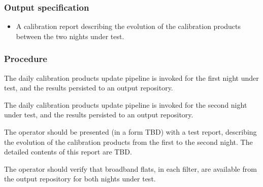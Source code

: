 \subsubsection{Output specification}

\begin{itemize}

  \item{A calibration report describing the evolution of the calibration
  products between the two nights under test.}

\end{itemize}

\subsubsection{Procedure}

The daily calibration products update pipeline is invoked for the first night
under test, and the results persisted to an output repository.

The daily calibration products update pipeline is invoked for the second night
under test, and the results persisted to an output repository.

The operator should be presented (in a form TBD) with a test report,
describing the evolution of the calibration products from the first to the
second night. The detailed contents of this report are TBD.

The operator should verify that broadband flats, in each filter, are available
from the output repository for both nights under test.
